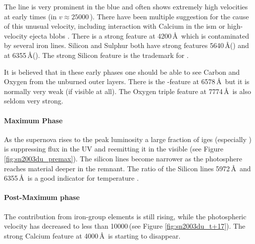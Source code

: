 The  line is very prominent in the blue and often shows extremely high velocities at early times (in  $v \approx 25000$\,\kms). There have been multiple suggestion for the cause of this unusual velocity, including interaction with Calcium in the \gls{ism} or high-velocity ejecta blobs \citep{1999ApJ...525..881H,2004ApJ...607..391G,2004ApJ...601.1019T,2005ApJ...623L..37M,2006ApJ...636..400Q,2006ApJ...645..470T,2007A&A...471..527G}.
There is a strong  feature at 4200\,\AA\ which is contaminated by several iron lines. Silicon and Sulphur both have strong features 5640\,\AA () and at 6355\,\AA (). The strong Silicon feature is the trademark for \sneia.

It is believed that in these early phases one should be able to see Carbon and Oxygen from the unburned outer layers. There is the -feature at 6578\,\AA\ but it is normally very weak (if visible at all). The Oxygen triple feature at 7774\,\AA\ is also seldom very strong.

\paragraph{Maximum Phase} As the supernova rises to the peak luminosity a large fraction of \glspl{ige} (especially \Ni) is suppressing flux in the UV and reemitting it in the visible (see Figure \ref{fig:sn2003du_premax}). The silicon lines become narrower as the photosphere reaches material deeper in the remnant. The ratio of the Silicon lines  5972\,\AA\ and  6355\,\AA\ is a good indicator for temperature \citep{1995ApJ...455L.147N}. 


\paragraph{Post-Maximum phase}
The contribution from iron-group elements is still rising, while the photospheric velocity has decreased to less than 10000\,\kms (see Figure \ref{fig:sn2003du_t+17}). The strong Calcium feature at 4000\,\AA\ is starting to disappear. 

